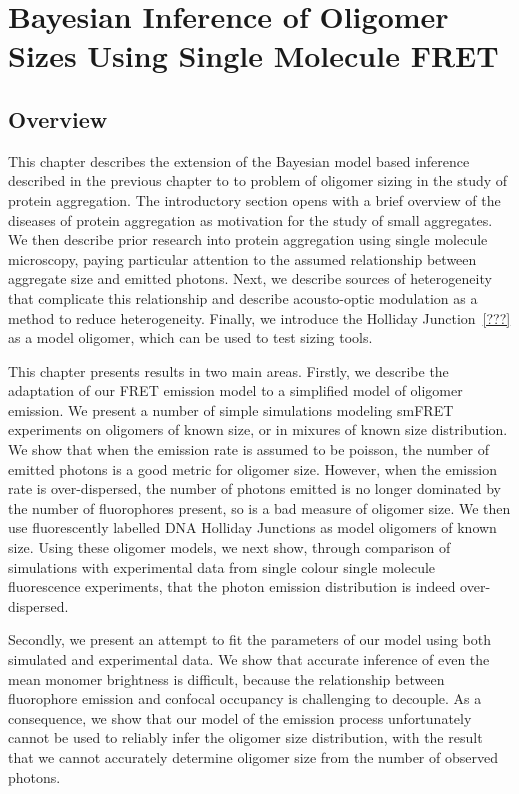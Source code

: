 \chapter{Bayesian Inference of Oligomer Sizes Using Single Molecule FRET}

\section{Overview}
This chapter describes the extension of the Bayesian model based inference described in the previous chapter to to problem of oligomer sizing in the study of protein aggregation. The introductory section opens with a brief overview of the diseases of protein aggregation as motivation for the study of small aggregates. We then describe prior research into protein aggregation using single molecule microscopy, paying particular attention to the assumed relationship between aggregate size and emitted photons. Next, we describe sources of heterogeneity that complicate this relationship and describe acousto-optic modulation as a method to reduce heterogeneity. Finally, we introduce the Holliday Junction~\ref{???} as a model oligomer, which can be used to test sizing tools.

This chapter presents results in two main areas. Firstly, we describe the adaptation of our FRET emission model to a simplified model of oligomer emission. We present a number of simple simulations modeling smFRET experiments on oligomers of known size, or in mixures of known size distribution. We show that when the emission rate is assumed to be poisson, the number of emitted photons is a good metric for oligomer size. However, when the emission rate is over-dispersed, the number of photons emitted is no longer dominated by the number of fluorophores present, so is a bad measure of oligomer size. We then use fluorescently labelled DNA Holliday Junctions as model oligomers of known size. Using these oligomer models, we next show, through comparison of simulations with experimental data from single colour single molecule fluorescence experiments, that the photon emission distribution is indeed over-dispersed. 

Secondly, we present an attempt to fit the parameters of our model using both simulated and experimental data. We show that accurate inference of even the mean monomer brightness is difficult, because the relationship between fluorophore emission and confocal occupancy is challenging to decouple. As a consequence, we show that our model of the emission process unfortunately cannot be used to reliably infer the oligomer size distribution, with the result that we cannot accurately determine oligomer size from the number of observed photons.

